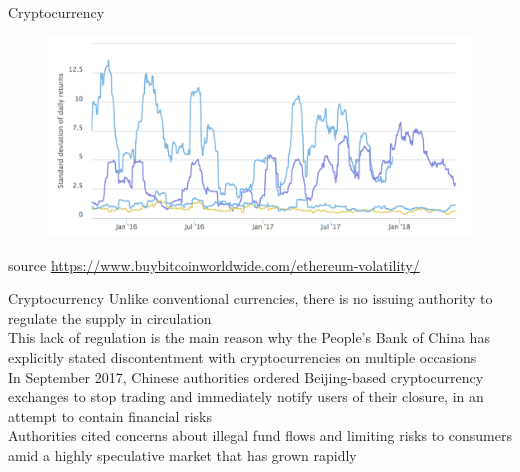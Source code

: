 \documentclass[11pt]{beamer}
\begin{document}


\begin{frame}{Cryptocurrency}
	\begin{figure}[]
		\centering
		\includegraphics  [width=4.in]{Images/vol}
	\end{figure}
	\begin{scriptsize}
		source \href{https://www.buybitcoinworldwide.com/ethereum-volatility/}{https://www.buybitcoinworldwide.com/ethereum-volatility/}
	\end{scriptsize}

\end{frame}



\begin{frame}{Cryptocurrency}
	Unlike conventional currencies, there is no issuing authority to regulate the supply in circulation \\ \vspace{3mm}
	This lack of regulation is the main reason why the People's Bank of China has explicitly stated discontentment with cryptocurrencies on multiple occasions\\ \vspace{3mm}
	In September 2017, Chinese authorities ordered Beijing-based cryptocurrency exchanges to stop trading and immediately notify users of their closure, in an attempt to contain financial risks \\ \vspace{3mm}
	Authorities cited concerns about illegal fund flows and limiting risks to consumers amid a highly speculative market that has grown rapidly
\end{frame}

\end{document}
